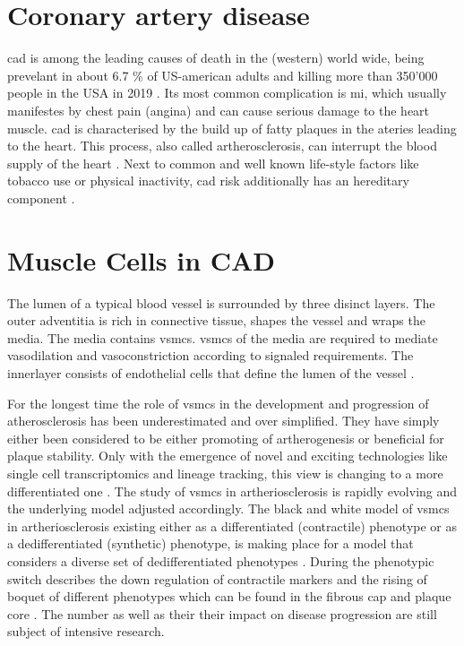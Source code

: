 \section{Coronary artery disease}
\label{sec:cad}
\Ac{cad} is among the leading causes of death in the (western) world wide, being prevelant in about 6.7 \% of US-american adults and killing more than 350'000 people in the USA in 2019 \cite{centersfordiseasecontrolandpreventionHeartDiseaseFacts2022, fryarPrevalenceUncontrolledRisk2012}. Its most common complication is \ac{mi}, which usually manifestes by chest pain (angina) and can cause serious damage to the heart muscle. \Ac{cad} is characterised by the build up of fatty plaques in the ateries leading to the heart. This process, also called artherosclerosis, can interrupt the blood supply of the heart \cite{nationalhealthserviceHeartAttack2017}. Next to common and well known life-style factors like tobacco use or physical inactivity, \ac{cad} risk additionally has an hereditary component \cite{taskforcemembers2013ESCGuidelines2013}.


\section{Muscle Cells in CAD}
\label{sec:haosms}
The lumen of a typical blood vessel is surrounded by three disinct layers. The outer adventitia is rich in connective tissue, shapes the vessel and wraps the media. The media contains \acp{vsmc}. \Acp{vsmc} of the media are required to mediate vasodilation and vasoconstriction according to signaled requirements. The innerlayer consists of endothelial cells that define the lumen of the vessel \cite{tuckerAnatomyBloodVessels2022a, yapSixShadesVascular2021}.

For the longest time the role of \acp{vsmc} in the development and progression of atherosclerosis has been underestimated and over simplified. They have simply either been considered to be either promoting of artherogenesis or beneficial for plaque stability. Only with the emergence of novel and exciting technologies like single cell transcriptomics and lineage tracking, this view is changing to a more differentiated one \cite{grootaertVascularSmoothMuscle2021, yapSixShadesVascular2021}. The study of \acp{vsmc} in artheriosclerosis is rapidly evolving and the underlying model adjusted accordingly. The black and white model of \acp{vsmc} in artheriosclerosis existing either as a differentiated (contractile) phenotype or as a dedifferentiated (synthetic) phenotype, is making place for a model that considers a diverse set of dedifferentiated phenotypes \cite{grootaertVascularSmoothMuscle2021, yapSixShadesVascular2021}. During the phenotypic switch describes the down regulation of contractile markers and the rising of boquet of different phenotypes which can be found in the fibrous cap and plaque core \cite{grootaertVascularSmoothMuscle2021}. The number as well as their their impact on disease progression are still subject of intensive research.

